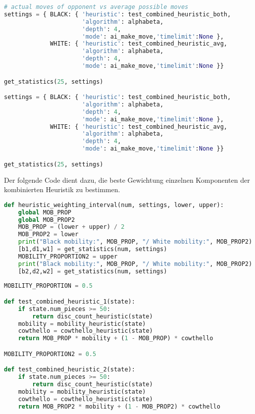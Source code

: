 \begin{lstlisting}[language=Python]
# actual moves of opponent vs average possible moves
settings = { BLACK: { 'heuristic': test_combined_heuristic_both,
                      'algorithm': alphabeta,
                      'depth': 4,
                      'mode': ai_make_move,'timelimit':None },
             WHITE: { 'heuristic': test_combined_heuristic_avg,
                      'algorithm': alphabeta,
                      'depth': 4,
                      'mode': ai_make_move,'timelimit':None }}

get_statistics(25, settings)

settings = { BLACK: { 'heuristic': test_combined_heuristic_both,
                      'algorithm': alphabeta,
                      'depth': 4,
                      'mode': ai_make_move,'timelimit':None },
             WHITE: { 'heuristic': test_combined_heuristic_avg,
                      'algorithm': alphabeta,
                      'depth': 4,
                      'mode': ai_make_move,'timelimit':None }}

get_statistics(25, settings)
\end{lstlisting}

Der folgende Code dient dazu, die beste Gewichtung einzelnen Komponenten
der kombinierten Heuristik zu bestimmen.

\begin{lstlisting}[language=Python]
def heuristic_weighting_interval(num, settings, lower, upper):
    global MOB_PROP
    global MOB_PROP2
    MOB_PROP = (lower + upper) / 2
    MOB_PROP2 = lower
    print("Black mobility:", MOB_PROP, "/ White mobility:", MOB_PROP2)
    [b1,d1,w1] = get_statistics(num, settings)
    MOBILITY_PROPORTION2 = upper
    print("Black mobility:", MOB_PROP, "/ White mobility:", MOB_PROP2)
    [b2,d2,w2] = get_statistics(num, settings)
    
MOBILITY_PROPORTION = 0.5

def test_combined_heuristic_1(state):
    if state.num_pieces >= 50:
        return disc_count_heuristic(state)
    mobility = mobility_heuristic(state)
    cowthello = cowthello_heuristic(state)
    return MOB_PROP * mobility + (1 - MOB_PROP) * cowthello

MOBILITY_PROPORTION2 = 0.5

def test_combined_heuristic_2(state):
    if state.num_pieces >= 50:
        return disc_count_heuristic(state)
    mobility = mobility_heuristic(state)
    cowthello = cowthello_heuristic(state)
    return MOB_PROP2 * mobility + (1 - MOB_PROP2) * cowthello
\end{lstlisting}

